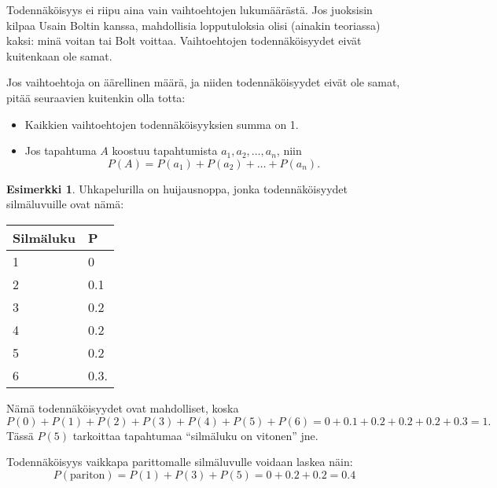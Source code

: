 \documentclass[12pt,leqno,a4paper,oneside]{amsart}
\theoremstyle{definition}
\newtheorem{example}[proclaim]{Esimerkki}
\theoremstyle{remark}
\numberwithin{equation}{section}
\begin{document}
\vspace{10pt}

Todennäköisyys ei riipu aina vain vaihtoehtojen lukumäärästä. Jos juoksisin kilpaa Usain Boltin kanssa, mahdollisia lopputuloksia
olisi (ainakin teoriassa) kaksi: minä voitan tai Bolt voittaa. Vaihtoehtojen todennäköisyydet eivät kuitenkaan ole samat.

Jos vaihtoehtoja on äärellinen määrä, ja niiden todennäköisyydet eivät ole samat, pitää seuraavien kuitenkin olla totta:
\begin{itemize}
 \item 
 Kaikkien vaihtoehtojen todennäköisyyksien summa on 1.
 \item
 Jos tapahtuma $A$ koostuu tapahtumista $a_1 , a_2, \ldots ,a_n$, niin 
 $$P(A) = P(a_1 ) + P(a_2 ) +\ldots +P(a_n ) .$$ 
\end{itemize}

\begin{example}
 Uhkapelurilla on huijausnoppa, jonka todennäköisyydet silmäluvuille ovat nämä:
 
 \begin{center}
 \begin{tabular}{l|l}
  Silmäluku & P\\
  \hline
  1 & 0\\
  2 & 0.1 \\
  3 & 0.2 \\
  4 & 0.2 \\
  5 & 0.2 \\
  6 & 0.3.
 \end{tabular}
 \end{center}

 Nämä todennäköisyydet ovat mahdolliset, koska 
 $$P(0) + P(1) + P(2) + P(3) + P(4) + P(5) + P(6) = 0 + 0.1 + 0.2 + 0.2 + 0.2 + 0.3 =1.$$
 Tässä $P(5)$ tarkoittaa tapahtumaa ``silmäluku on vitonen'' jne.
 
 Todennäköisyys vaikkapa parittomalle silmäluvulle voidaan laskea näin:
 $$P(\text{pariton} ) = P(1)+P(3)+P(5) = 0 + 0.2 + 0.2 = 0.4$$
 
\end{example}


\end{document}
